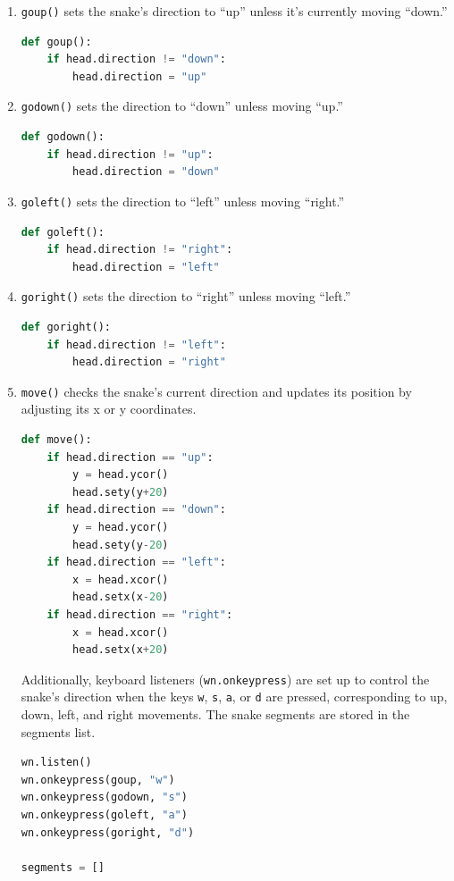 \begin{enumerate}
  \item \texttt{goup()} sets the snake’s direction to “up” unless it’s currently moving “down.”
\begin{lstlisting}[language=Python]
def goup():
    if head.direction != "down":
        head.direction = "up"
\end{lstlisting}

  \item \texttt{godown()} sets the direction to “down” unless moving “up.”
\begin{lstlisting}[language=Python]
def godown():
    if head.direction != "up":
        head.direction = "down"
\end{lstlisting}

  \item \texttt{goleft()} sets the direction to “left” unless moving “right.”
\begin{lstlisting}[language=Python]
def goleft():
    if head.direction != "right":
        head.direction = "left"
\end{lstlisting}

  \item \texttt{goright()} sets the direction to “right” unless moving “left.”
\begin{lstlisting}[language=Python]
def goright():
    if head.direction != "left":
        head.direction = "right"
\end{lstlisting}

\item \texttt{move()} checks the snake’s current direction and updates its position by adjusting its x or y coordinates.
\begin{lstlisting}[language=Python]
def move():
    if head.direction == "up":
        y = head.ycor()
        head.sety(y+20)
    if head.direction == "down":
        y = head.ycor()
        head.sety(y-20)
    if head.direction == "left":
        x = head.xcor()
        head.setx(x-20)
    if head.direction == "right":
        x = head.xcor()
        head.setx(x+20)
\end{lstlisting}

Additionally, keyboard listeners (\texttt{wn.onkeypress}) are set up to control the snake’s direction when the keys \texttt{w}, \texttt{s}, \texttt{a}, or \texttt{d} are pressed, corresponding to up, down, left, and right movements. The snake segments are stored in the segments list.

\begin{lstlisting}[language=Python]
wn.listen()
wn.onkeypress(goup, "w")
wn.onkeypress(godown, "s")
wn.onkeypress(goleft, "a")
wn.onkeypress(goright, "d")

segments = []
\end{lstlisting}
\end{enumerate}

